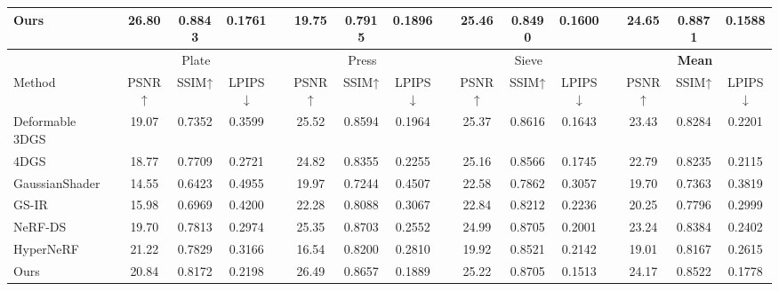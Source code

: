 \begin{table}[t]
{\begin{tabular}{lccccccccccccccc}
    Ours &\colorbox{red!25}{26.80} &\colorbox{red!25}{0.8843} &\colorbox{red!25}{0.1761} & &\colorbox{yellow!25}{19.75} &\colorbox{yellow!25}{0.7915} &\colorbox{red!25}{0.1896} & &\colorbox{red!25}{25.46} &\colorbox{red!25}{0.8490} &\colorbox{red!25}{0.1600} & &\colorbox{red!25}{24.65} &\colorbox{red!25}{0.8871} &\colorbox{red!25}{0.1588} \\ 
    \midrule
     & \multicolumn{3}{c}{Plate} & &\multicolumn{3}{c}{Press}& &\multicolumn{3}{c}{Sieve}& &\multicolumn{3}{c}{\textbf{Mean}} \\ \cmidrule{2-4} \cmidrule{6-8} \cmidrule{10-12} \cmidrule{14-16}
    Method & PSNR↑ & SSIM↑& LPIPS↓& &PSNR↑ & SSIM↑& LPIPS↓& &PSNR↑ & SSIM↑& LPIPS↓& &PSNR↑ & SSIM↑& LPIPS↓  \\ 
    \midrule
    Deformable 3DGS~\citep{yang2023deformable} &19.07 &0.7352 &0.3599 & &\colorbox{orange!25}{25.52} &\colorbox{yellow!25}{0.8594} &\colorbox{orange!25}{0.1964} & &\colorbox{red!25}{25.37} &\colorbox{orange!25}{0.8616} &\colorbox{orange!25}{0.1643} & &\colorbox{orange!25}{23.43} &\colorbox{yellow!25}{0.8284} &\colorbox{yellow!25}{0.2201} \\ 
    4DGS~\citep{wu20234d} &18.77 &0.7709 &\colorbox{orange!25}{0.2721} & &24.82 &0.8355 &\colorbox{yellow!25}{0.2255} & &\colorbox{yellow!25}{25.16} &0.8566 &\colorbox{yellow!25}{0.1745} & &22.79 &0.8235 &\colorbox{orange!25}{0.2115} \\
    GaussianShader~\citep{jiang2023gaussianshader} &14.55 &0.6423 &0.4955 & &19.97 &0.7244 &0.4507 & &22.58 &0.7862 &0.3057 & &19.70 &0.7363 &0.3819 \\
    GS-IR~\citep{liang2023gs} &15.98 &0.6969 &0.4200 & &22.28 &0.8088 &0.3067 & &22.84 &0.8212 &0.2236 & &20.25 &0.7796 &0.2999 \\
    NeRF-DS~\citep{yan2023nerf} &\colorbox{yellow!25}{19.70} &\colorbox{yellow!25}{0.7813} &\colorbox{yellow!25}{0.2974} & &\colorbox{yellow!25}{25.35} &\colorbox{red!25}{0.8703} &0.2552 & &24.99 &\colorbox{red!25}{0.8705} &0.2001 & &\colorbox{yellow!25}{23.24} &\colorbox{orange!25}{0.8384 }&0.2402 \\
    HyperNeRF~\citep{park2021hypernerf} &\colorbox{red!25}{21.22} &\colorbox{orange!25}{0.7829} &0.3166 & &16.54 &0.8200 &0.2810 & &19.92 &0.8521 &0.2142 & &19.01 &0.8167 &0.2615 \\
    Ours &\colorbox{orange!25}{20.84} &\colorbox{red!25}{0.8172} &\colorbox{red!25}{0.2198} & &\colorbox{red!25}{26.49} &\colorbox{orange!25}{0.8657} &\colorbox{red!25}{0.1889} & &\colorbox{orange!25}{25.22} &\colorbox{red!25}{0.8705} &\colorbox{red!25}{0.1513} & &\colorbox{red!25}{24.17} &\colorbox{red!25}{0.8522 }&\colorbox{red!25}{0.1778} \\ 
    \bottomrule
    \end{tabular}
    }
\end{table}